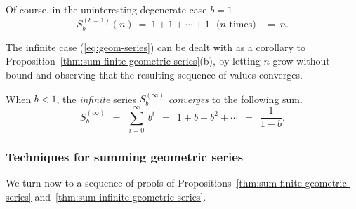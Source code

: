 Of course, in the uninteresting degenerate case $b=1$
\[ S^{(b=1)}_{b}(n) \ = \ 1 + 1 + \cdots + 1 \ \ \ \mbox{($n$ times)}
  \ \ \ \ = \ n.  \]

\medskip

The infinite case (\ref{eq:geom-series}) can be dealt with as a
corollary to Proposition~\ref{thm:sum-finite-geometric-series}(b), by
letting $n$ grow without bound and observing that the resulting
sequence of values converges.

\begin{prop}
\label{thm:sum-infinite-geometric-series}
When $b < 1$,  the {\em infinite} series $S^{(\infty)}_{b}$ {\em
  converges} to the following sum.
\[ S^{(\infty)}_{b} \ \ = \ \
\sum_{i=0}^\infty \ b^i \ \ = \ \ 1 + b + b^2 + \cdots
 \ \ = \ \ \frac{1}{1-b}.
\]
\end{prop}

\subsubsection{Techniques for summing geometric series}
\label{sec:summing-geometric-series:techniques}

We turn now to a sequence of proofs of
Propositions~\ref{thm:sum-finite-geometric-series}
and~\ref{thm:sum-infinite-geometric-series}.

\medskip

